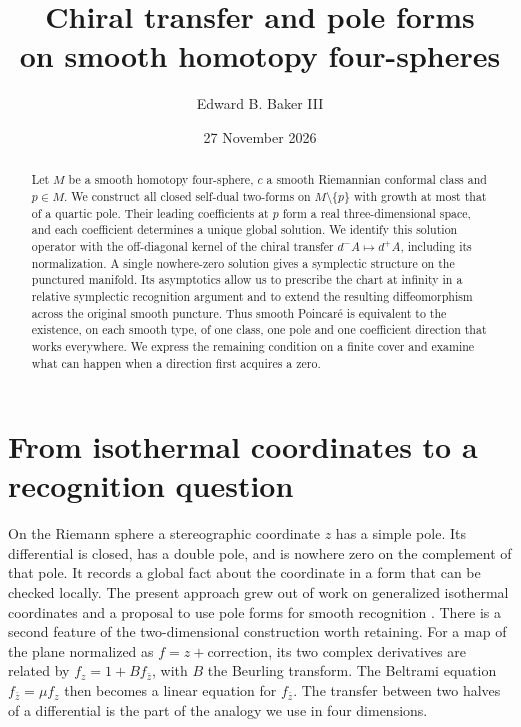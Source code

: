 \documentclass[11pt,letterpaper]{article}
\title{Chiral transfer and pole forms\\on smooth homotopy four-spheres}
\author{Edward B. Baker III}
\date{27 November 2026}
\numberwithin{equation}{section}
\begin{document}
\maketitle

\begin{abstract}
Let \(M\) be a smooth homotopy four-sphere, \(c\) a smooth Riemannian
conformal class and \(p\in M\). We construct all closed self-dual
two-forms on \(M\setminus\{p\}\) with growth at most that of a quartic pole.
Their leading coefficients at \(p\) form a real three-dimensional space,
and each coefficient determines a unique global solution. We identify
this solution operator with the off-diagonal kernel of the chiral transfer
\(d^-A\mapsto d^+A\), including its normalization. A single nowhere-zero
solution gives a symplectic structure on the punctured manifold. Its
asymptotics allow us to prescribe the chart at infinity in a relative
symplectic recognition argument and to extend the resulting diffeomorphism
across the original smooth puncture. Thus smooth Poincar\'e is equivalent
to the existence, on each smooth type, of one class, one pole and one
coefficient direction that works everywhere. We express the remaining
condition on a finite cover and examine what can happen when a direction
first acquires a zero.
\end{abstract}

\section{From isothermal coordinates to a recognition question}

On the Riemann sphere a stereographic coordinate \(z\) has a simple pole.
Its differential is closed, has a double pole, and is nowhere zero on the
complement of that pole. It records a global fact about the coordinate in
a form that can be checked locally. The present approach grew out of
work on generalized isothermal coordinates \cite{BakerCurved2025,BakerIsothermal2026}
and a proposal to use pole forms for smooth recognition
\cite{Baker2026PoleFormsProposal}. There is a second feature of the
two-dimensional construction worth retaining. For a map of the plane
normalized as \(f=z+\text{correction}\), its two complex derivatives
are related by \(f_z=1+Bf_{\bar z}\), with \(B\) the Beurling transform.
The Beltrami equation \(f_{\bar z}=\mu f_z\) then becomes a linear
equation for \(f_{\bar z}\). The transfer between two halves of a
differential is the part of the analogy we use in four dimensions.
\end{document}
